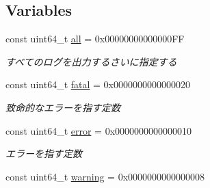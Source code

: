 \subsection*{Variables}
\begin{DoxyCompactItemize}
\item 
\mbox{\label{namespace_g_a_1_1loglevel_afd59244a2773df14653a08d10924298b}} 
const uint64\+\_\+t \mbox{\hyperlink{namespace_g_a_1_1loglevel_afd59244a2773df14653a08d10924298b}{all}} = 0x00\textquotesingle{}00\textquotesingle{}00\textquotesingle{}00\textquotesingle{}00\textquotesingle{}00\textquotesingle{}00\textquotesingle{}\+FF
\begin{DoxyCompactList}\small\item\em すべてのログを出力するさいに指定する \end{DoxyCompactList}\item 
\mbox{\label{namespace_g_a_1_1loglevel_a0cc8d7951f036f4b819ee0b1a04ec8ca}} 
const uint64\+\_\+t \mbox{\hyperlink{namespace_g_a_1_1loglevel_a0cc8d7951f036f4b819ee0b1a04ec8ca}{fatal}} = 0x00\textquotesingle{}00\textquotesingle{}00\textquotesingle{}00\textquotesingle{}00\textquotesingle{}00\textquotesingle{}00\textquotesingle{}20
\begin{DoxyCompactList}\small\item\em 致命的なエラーを指す定数 \end{DoxyCompactList}\item 
\mbox{\label{namespace_g_a_1_1loglevel_a8d35bba4b491010381be09e460493c1c}} 
const uint64\+\_\+t \mbox{\hyperlink{namespace_g_a_1_1loglevel_a8d35bba4b491010381be09e460493c1c}{error}} = 0x00\textquotesingle{}00\textquotesingle{}00\textquotesingle{}00\textquotesingle{}00\textquotesingle{}00\textquotesingle{}00\textquotesingle{}10
\begin{DoxyCompactList}\small\item\em エラーを指す定数 \end{DoxyCompactList}\item 
\mbox{\label{namespace_g_a_1_1loglevel_a2efe57d3158d4bc6500b2f54eed47a53}} 
const uint64\+\_\+t \mbox{\hyperlink{namespace_g_a_1_1loglevel_a2efe57d3158d4bc6500b2f54eed47a53}{warning}} = 0x00\textquotesingle{}00\textquotesingle{}00\textquotesingle{}00\textquotesingle{}00\textquotesingle{}00\textquotesingle{}00\textquotesingle{}08

\end{DoxyCompactItemize}

